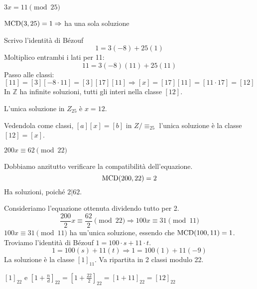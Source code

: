 \begin{exmp}
$3x = 11 \pmod 25$

$\operatorname{MCD}(3, 25) = 1 \Rightarrow$ ha una sola soluzione

Scrivo l'identit\`a di B\'ezouf
\[
1 = 3 (-8) + 25 (1) 
\]
Moltiplico entrambi i lati per 11:
\[
11 = 3 (-8) (11) + 25 (11)
\]
Passo alle classi:
\[
[11] = [3] [-8 \cdot 11] = [3] [17] [11] \Rightarrow [x] = [17] [11] = [11 \cdot 17] = [12]
\]
In $\mathbb{Z}$ ha infinite soluzioni, tutti gli interi nella classe $[12]$.

L'unica soluzione in $Z_{25}$ \`e $x = 12$.

Vedendola come classi, $[a] [x] = [b]$ in $Z / \equiv_{25}$ l'unica soluzione \`e la classe $[12] = [x]$.
\end{exmp}

\begin{exmp}
$200 x \equiv 62 \pmod 22$

Dobbiamo anzitutto verificare la compatibilit\`a dell'equazione.
\[
\operatorname{MCD}(200, 22) = 2
\]
Ha soluzioni, poich\'e $2 | 62$.

Consideriamo l'equazione ottenuta dividendo tutto per 2.
\[
\frac{200}{2} x \equiv \frac{62}{2} \pmod 22 \Rightarrow 100 x \equiv 31 \pmod 11
\]
$100 x \equiv 31 \pmod 11$ ha un'unica soluzione, essendo che $\operatorname{MCD}(100, 11) = 1$. Troviamo l'identit\`a di B\'ezouf $1 = 100 \cdot s + 11 \cdot t$.
\[
1 = 100 (s) + 11 (t) \Rightarrow 1 = 100 (1) + 11 (-9)
\]
La soluzione \`e la classe $[1]_{11}$. Va ripartita in 2 classi modulo 22.

$[1]_{22}$ e $[1 + \frac{n}{d}]_{22} = [1 + \frac{22}{2}]_{22} = [1 + 11]_{22} = [12]_{22} $
\end{exmp}





















